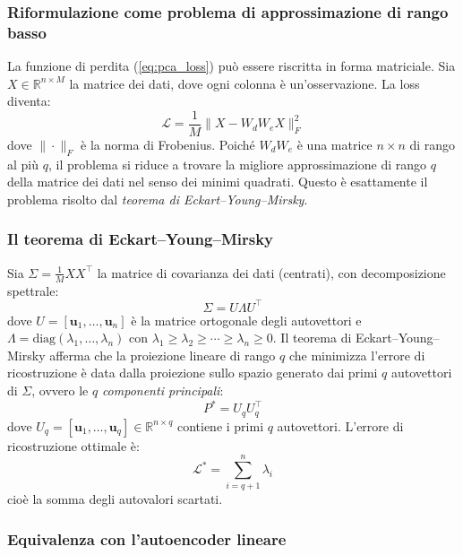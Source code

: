\subsubsection{Riformulazione come problema di approssimazione di rango basso}

La funzione di perdita (\ref{eq:pca_loss}) può essere riscritta in forma matriciale. Sia $X \in \mathbb{R}^{n \times M}$ la matrice dei dati, dove ogni colonna è un'osservazione. La loss diventa:
\begin{equation}
    \mathcal{L} = \frac{1}{M} \| X - W_d W_e X \|_F^2
\end{equation}
dove $\| \cdot \|_F$ è la norma di Frobenius. Poiché $W_d W_e$ è una matrice $n \times n$ di rango al più $q$, il problema si riduce a trovare la migliore approssimazione di rango $q$ della matrice dei dati nel senso dei minimi quadrati. Questo è esattamente il problema risolto dal \textit{teorema di Eckart--Young--Mirsky}.

\subsubsection{Il teorema di Eckart--Young--Mirsky}

Sia $\Sigma = \frac{1}{M} X X^\top$ la matrice di covarianza dei dati (centrati), con decomposizione spettrale:
\begin{equation}
    \Sigma = U \Lambda U^\top
\end{equation}
dove $U = [\mathbf{u}_1, \ldots, \mathbf{u}_n]$ è la matrice ortogonale degli autovettori e $\Lambda = \text{diag}(\lambda_1, \ldots, \lambda_n)$ con $\lambda_1 \geq \lambda_2 \geq \cdots \geq \lambda_n \geq 0$. Il teorema di Eckart--Young--Mirsky afferma che la proiezione lineare di rango $q$ che minimizza l'errore di ricostruzione è data dalla proiezione sullo spazio generato dai primi $q$ autovettori di $\Sigma$, ovvero le $q$ \textit{componenti principali}:
\begin{equation}
    P^* = U_q U_q^\top
\end{equation}
dove $U_q = [\mathbf{u}_1, \ldots, \mathbf{u}_q] \in \mathbb{R}^{n \times q}$ contiene i primi $q$ autovettori. L'errore di ricostruzione ottimale è:
\begin{equation}
    \mathcal{L}^* = \sum_{i=q+1}^{n} \lambda_i
\end{equation}
cioè la somma degli autovalori scartati.

\subsubsection{Equivalenza con l'autoencoder lineare}

